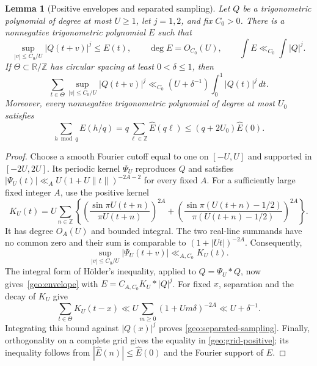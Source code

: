 \documentclass[11pt,a4paper]{article}
\theoremstyle{paperplain}
\newtheorem{lemma}[theorem]{Lemma}
\numberwithin{equation}{section}
\begin{document}
\begin{lemma}[Positive envelopes and separated sampling]\label{geo:sampling}
Let $Q$ be a trigonometric polynomial of degree at most $U\ge1$,
let $j=1,2$, and fix $C_0>0$. There is a nonnegative trigonometric
polynomial $E$ such that
\begin{equation}\label{geo:envelope}
 \sup_{|v|\le C_0/U}|Q(t+v)|^j\le E(t),\qquad
 \deg E=O_{C_0}(U),\qquad \int E\ll_{C_0}\int|Q|^j.
\end{equation}
If $\Theta\subset\mathbb R/\mathbb Z$ has circular spacing at least
$0<\delta\le1$, then
\begin{equation}\label{geo:separated-sampling}
 \sum_{t\in\Theta}\sup_{|v|\le C_0/U}|Q(t+v)|^j
 \ll_{C_0}(U+\delta^{-1})\int_0^1|Q(t)|^j\,dt.
\end{equation}
Moreover, every nonnegative trigonometric polynomial of degree at most
$U_0$ satisfies
\begin{equation}\label{geo:grid-positive}
 \sum_{h\bmod q}E(h/q)
 =q\sum_{\ell\in\mathbb Z}\widehat E(q\ell)
 \le(q+2U_0)\widehat E(0).
\end{equation}
\end{lemma}

\begin{proof}
Choose a smooth Fourier cutoff equal to one on $[-U,U]$ and supported
in $[-2U,2U]$. Its periodic kernel $\Psi_U$ reproduces $Q$ and satisfies
$|\Psi_U(t)|\ll_A U(1+U\|t\|)^{-2A-2}$ for every fixed $A$.
For a sufficiently large fixed integer $A$, use the positive kernel
\[
 K_U(t)=U\sum_{n\in\mathbb Z}\left\{
 \left(\frac{\sin\pi U(t+n)}{\pi U(t+n)}\right)^{2A}
 +\left(\frac{\sin\pi(U(t+n)-1/2)}{\pi(U(t+n)-1/2)}\right)^{2A}
 \right\}.
\]
It has degree $O_A(U)$ and bounded integral. The two real-line summands
have no common zero and their sum is comparable to
$(1+|Ut|)^{-2A}$. Consequently,
\[
 \sup_{|v|\le C_0/U}|\Psi_U(t+v)|\ll_{A,C_0}K_U(t).
\]
The integral form of H\"older's inequality, applied to
$Q=\Psi_U*Q$, now gives~\eqref{geo:envelope} with
$E=C_{A,C_0}K_U*|Q|^j$.
For fixed $x$, separation and the decay of $K_U$ give
\[
 \sum_{t\in\Theta}K_U(t-x)
 \ll U\sum_{m\ge0}(1+Um\delta)^{-2A}
 \ll U+\delta^{-1}.
\]
Integrating this bound against $|Q(x)|^j$ proves
\eqref{geo:separated-sampling}.
Finally, orthogonality on a complete grid gives the equality in
\eqref{geo:grid-positive}; its inequality follows from
$|\widehat E(n)|\le\widehat E(0)$ and the Fourier support of $E$.
\end{proof}
\end{document}

